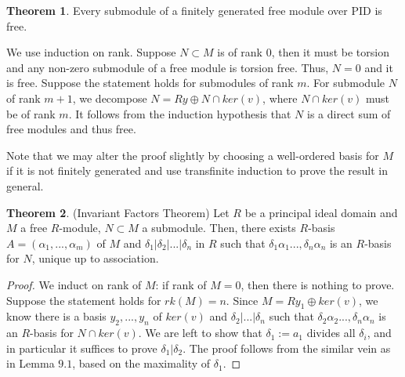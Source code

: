 \documentclass{article}
\theoremstyle{definition}
\newtheorem{theorem}{Theorem}[section]
\theoremstyle{definition}
\theoremstyle{definition}
\theoremstyle{definition}
\theoremstyle{definition}
\theoremstyle{definition}
\theoremstyle{definition}
\begin{document}
\begin{tcolorbox}[colback=red!5!white,colframe=red!30!white]
\begin{theorem}
Every submodule of a finitely generated free module over PID is free.
\end{theorem}
\end{tcolorbox}
We use induction on rank. Suppose $N\subset M$ is of rank $0$, then it must be torsion and any non-zero submodule of a free module is torsion free. Thus, $N=0$ and it is free. Suppose the statement holds for submodules of rank $m$. For submodule $N$ of rank $m+1$, we decompose $N= Ry\oplus N\cap ker(v)$, where $ N\cap ker(v)$ must be of rank $m$. It follows from the induction hypothesis that $N$ is a direct sum of free modules and thus free. 

Note that we may alter the proof slightly by choosing a well-ordered basis for $M$ if it is not finitely generated and use transfinite induction to prove the result in general.



\begin{tcolorbox}[colback=red!5!white,colframe=red!30!white]
\begin{theorem}
(Invariant Factors Theorem) Let $R$ be a principal ideal domain and $M$ a free $R$-module, $N\subset M$ a submodule. Then, there exists $R$-basis $A=(\alpha_1,...,\alpha_m)$ of $M$ and $\delta_1|\delta_2|...|\delta_n$ in $R$ such that $\delta_1\alpha_1...,\delta_n\alpha_n$ is an $R$-basis for $N$, unique up to association. 
\end{theorem}
\end{tcolorbox}
\begin{proof}
We induct on rank of $M$: if rank of $M=0$, then there is nothing to prove. Suppose the statement holds for $rk(M)=n$. Since $M=Ry_1\oplus ker(v)$, we know there is a basis $y_2,...,y_{n}$ of $ker(v)$ and $\delta_2|...|\delta_n$ such that $\delta_2\alpha_2...,\delta_n\alpha_n$ is an $R$-basis for $N\cap ker(v)$. We are left to show that $\delta_1:=a_1$ divides all $\delta_i$, and in particular it suffices to prove $\delta_1|\delta_2$. The proof follows from the similar vein as in Lemma $9.1$, based on the maximality of $\delta_1$.  
   
\end{proof}
\end{document}
